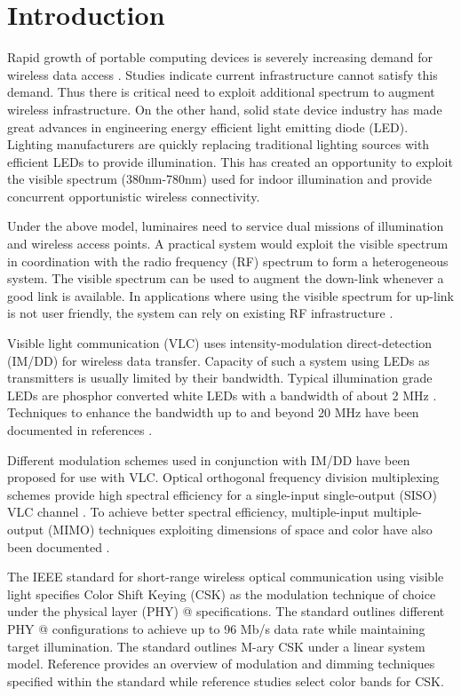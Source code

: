 \documentclass[10pt,letterpaper]{article}
\makeatletter
\newcommand*{\rmnum}[1]{\expandafter\@slowromancap\romannumeral #1@}
\makeatother
\begin{document}
\section{Introduction}\label{sINTR}

Rapid growth of portable computing devices is severely increasing demand for wireless data access \cite{cis14a}. Studies indicate current infrastructure cannot satisfy this demand. Thus there is critical need to exploit additional spectrum to augment wireless infrastructure. On the other hand, solid state device industry has made great advances in engineering energy efficient light emitting diode (LED). Lighting manufacturers are quickly replacing traditional lighting sources with efficient LEDs to provide illumination. This has created an opportunity to exploit the visible spectrum (380nm-780nm) used for indoor illumination and provide concurrent opportunistic wireless connectivity. 

Under the above model, luminaires need to service dual missions of illumination and wireless access points. A practical system would exploit the visible spectrum in coordination with the radio frequency (RF) spectrum to form a heterogeneous system. The visible spectrum can be used to augment the down-link whenever a good link is available. In applications where using the visible spectrum for up-link is not user friendly, the system can rely on existing RF infrastructure \cite{rah15a}.

Visible light communication (VLC) uses intensity-modulation direct-detection (IM/DD) for wireless data transfer. Capacity of such a system using LEDs as transmitters is usually limited by their bandwidth. Typical illumination grade LEDs are phosphor converted white LEDs with a bandwidth of about 2 MHz \cite{gru08b}. Techniques to enhance the bandwidth up to and beyond 20 MHz have been documented in references \cite{gru08b,min08a}. 

Different modulation schemes used in conjunction with IM/DD have been proposed for use with VLC. Optical orthogonal frequency division multiplexing schemes provide high spectral efficiency for a single-input single-output (SISO) VLC channel \cite{arm09a}. To achieve better spectral efficiency, multiple-input multiple-output (MIMO) techniques exploiting dimensions of space and color have also been documented \cite{but14b,cskxy,but12a}.

The IEEE standard for short-range wireless optical communication using visible light \cite{ieee802.15.7} specifies Color Shift Keying (CSK) as the modulation technique of choice under the physical layer (PHY) \rmnum{3} specifications. The standard outlines different PHY \rmnum{3} configurations to achieve up to 96 Mb/s data rate while maintaining target illumination. The standard outlines M-ary CSK under a linear system model. Reference \cite{raj12a} provides an overview of modulation and dimming techniques specified within the standard while reference \cite{sin13a} studies select color bands for CSK.
\end{document}
